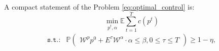 A compact statement of the Problem \eqref{eq:optimal_control} is:
\vspace{-3mm}
\[\min_{p^t, \alpha} \mathbb{E} \sum_{t=1}^T c(p^t) \]
\vspace{-3mm}
\begin{equation}
    \begin{aligned}
        \!\!\texttt{s.t.:}  & \mathbb{P}\!\! 
        \begin{pmatrix}
                \mathcal{W}^p p^0 + E^\tau \mathcal{W}^{\alpha} \cdot \alpha \leq \beta, 0 \leq \tau \leq T 
        \end{pmatrix}\!\geq\!1 - \eta,\!\!\!
    \end{aligned}
    \label{eq:optimal_control_2} 
\end{equation}


